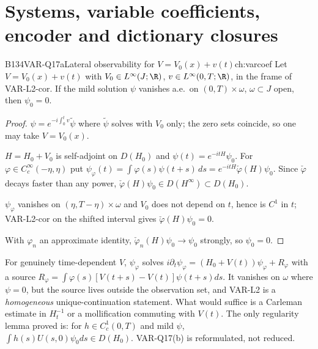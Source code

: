 \section{Systems, variable coefficients, encoder and dictionary closures}

\begin{dimcard}{B134}{VAR-Q17a}{Lateral observability for $V=V_0(x)+v(t)$}{\pw}{ch:varcoef}
Let $V=V_0(x)+v(t)$ with $V_0\in L^\infty(J;\R)$, $v\in L^\infty(0,T;\R)$, in the frame of VAR-L2-cor. If the mild solution $\psi$ vanishes a.e.\ on $(0,T)\times\omega$, $\omega\subset J$ open, then $\psi_0=0$.
\end{dimcard}

\begin{proof}
$\psi=e^{-i\int_0^tv}\tilde\psi$ where $\tilde\psi$ solves with $V_0$ only; the zero sets coincide, so one may take $V=V_0(x)$.

$H=H_0+V_0$ is self-adjoint on $D(H_0)$ and $\psi(t)=e^{-itH}\psi_0$. For $\varphi\in C_c^\infty(-\eta,\eta)$ put $\psi_\varphi(t)=\int\varphi(s)\psi(t+s)\,ds=e^{-itH}\check\varphi(H)\psi_0$. Since $\check\varphi$ decays faster than any power, $\check\varphi(H)\psi_0\in D(H^\infty)\subset D(H_0)$.

$\psi_\varphi$ vanishes on $(\eta,T-\eta)\times\omega$ and $V_0$ does not depend on $t$, hence is $C^1$ in $t$; VAR-L2-cor on the shifted interval gives $\check\varphi(H)\psi_0=0$.

With $\varphi_n$ an approximate identity, $\check\varphi_n(H)\psi_0\to\psi_0$ strongly, so $\psi_0=0$.

\end{proof}

\begin{caution}[title={Part (b): $V(t,x)$ stays open}]
For genuinely time-dependent $V$, $\psi_\varphi$ solves $i\partial_t\psi_\varphi=(H_0+V(t))\psi_\varphi+R_\varphi$ with a source $R_\varphi=\int\varphi(s)[V(t+s)-V(t)]\psi(t+s)ds$. It vanishes on $\omega$ where $\psi=0$, but the source lives outside the observation set, and VAR-L2 is a \emph{homogeneous} unique-continuation statement. What would suffice is a Carleman estimate in $H^{-1}_t$ or a mollification commuting with $V(t)$. The only regularity lemma proved is: for $h\in C^1_c(0,T)$ and mild $\psi$, $\int h(s)U(s,0)\psi_0ds\in D(H_0)$. VAR-Q17(b) is reformulated, not reduced.
\end{caution}

